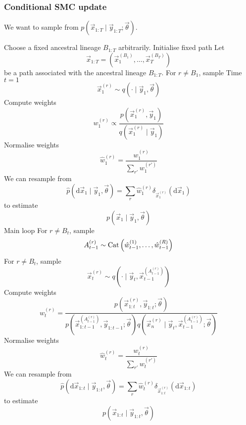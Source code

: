 \subsubsection{Conditional SMC update}
We want to sample from $p(\vec x_{1:T} \mid \vec y_{1:T}; \vec \theta)$.
    \begin{algorithmbis}\label{alg:csmc}
        \begin{algorithmic}[1]
            \State Choose a fixed ancestral lineage $B_{1:T}$ arbitrarily. \Comment Initialise fixed path
            \State Let
                $$\vec x_{1:T} = \left(\vec x_1^{(B_1)}, \dotsc, \vec x_T^{(B_T)}\right)$$
                be a path associated with the ancestral lineage $B_{1:T}$.
            \State For $r \neq B_1$, sample \Comment Time $t = 1$
                $$\vec x_1^{(r)} \sim q(\cdot \mid \vec y_1, \vec \theta)$$
            \State Compute weights
                $$w_1^{(r)} \propto \frac{p\left(\vec x_1^{(r)}, \vec y_1\right)}{q\left(\vec x_1^{(r)} \mid \vec y_1\right)}$$
            \State Normalise weights
                $$\hat w_1^{(r)} = \frac{w_1^{(r)}}{\sum_{r'} w_1^{(r')}}$$
            \State We can resample from 
                $$\hat p(\mathrm d \vec x_1 \mid \vec y_1, \vec \theta) = \sum_r \hat w_1^{(r)} \delta_{\vec x_1^{(r)}}(\mathrm d\vec x_1)$$
                to estimate
                $$p(\vec x_1 \mid \vec y_1, \vec \theta)$$
             \Comment Main loop
                \State For $r \neq B_t$, sample
                    $$A_{t - 1}^{(r)} \sim \operatorname{Cat}\left(\hat w_{t - 1}^{(1)}, \dotsc, \hat w_{t - 1}^{(R)}\right)$$
                \State For $r \neq B_t$, sample
                    $$\vec x_t^{(r)} \sim q\left(\cdot \mid \vec y_t, \vec x_{t - 1}^{(A_{t - 1}^{(r)})}\right)$$
                \State Compute weights
                    $$w_t^{(r)} = \frac{p\left(\vec x_{1:t}^{(r)}, \vec y_{1:t}; \vec \theta\right)}{p\left(\vec x_{1:t - 1}^{\left(A_{t - 1}^{(r)}\right)}, \vec y_{1:t-1}; \vec \theta\right) q\left(\vec x_n^{(r)} \mid \vec y_t, \vec x_{t - 1}^{\left(A_{t - 1}^{(r)}\right)}; \vec \theta\right)}$$
                \State Normalise weights
                    $$\hat w_t^{(r)} = \frac{w_t^{(r)}}{\sum_{r'} w_t^{(r')}}$$
                \State We can resample from
                    $$\hat p(\mathrm d \vec x_{1:t} \mid \vec y_{1:t}, \vec \theta) = \sum_r \hat w_t^{(r)} \delta_{\vec x_{1:t}^{(r)}}(\mathrm d \vec x_{1:t})$$
                    to estimate
                    $$p(\vec x_{1:t} \mid \vec y_{1:t}, \vec \theta)$$
            \EndFor
        \end{algorithmic}
    \end{algorithmbis}